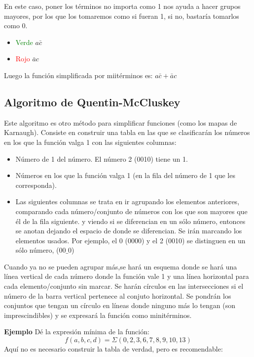 \documentclass[a4paper]{article}
\begin{document}
En este caso, poner los términos no importa como 1 nos ayuda a hacer grupos mayores, por los que los tomaremos como si fueran 1, si no, bastaría tomarlos como 0.
\begin{itemize}
\item \textcolor{green}{Verde} $a\bar{c}$
\item \textcolor{red}{Rojo} $\bar{a}c$
\end{itemize}
Luego la función simplificada por miitérminos es: $a\bar{c}+\bar{a}c$

\subsection{Algoritmo de Quentin-McCluskey}
Este algoritmo es otro método para simplificar funciones (como los mapas de Karnaugh). Consiste en construir una tabla en las que se clasificarán los números en los que la función valga 1 con las siguientes columnas:
\begin{itemize}
\item Número de 1 del número. El número 2 (0010) tiene un 1.
\item Números en los que la función valga 1 (en la fila del número de 1 que les corresponda).
\item Las siguientes columnas se trata en ir agrupando los elementos anteriores, comparando cada número/conjunto de números con los que son mayores que él de la fila siguiente. y viendo si se diferencian en un sólo número, entonces se anotan dejando el espacio de donde se diferencian. Se irán marcando los elementos usados. Por ejemplo, el 0 (0000) y el 2 (0010) se distinguen en un sólo número, ($00\_0$)
\end{itemize}
Cuando ya no se pueden agrupar más,se hará un esquema donde se hará una línea vertical de cada número donde la función vale 1 y una línea horizontal para cada elemento/conjunto sin marcar. Se harán círculos en las intersecciones si el número de la barra vertical pertenece al conjuto horizontal. Se pondrán los conjuntos que tengan un círculo en líneas donde ninguno más lo tengan (son imprescindibles) y se expresará la función como minitérminos.

\large{\textbf{Ejemplo}}
Dé la expresión mínima de la función:
$$f(a,b,c,d)=\Sigma(0,2,3,6,7,8,9,10,13)$$
Aquí no es necesario construir la tabla de verdad, pero es recomendable:
\end{document}
